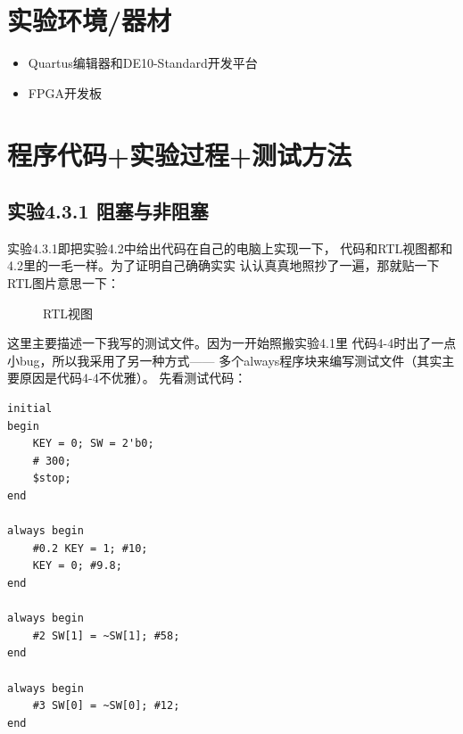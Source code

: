 \documentclass[12pt,a4paper,UTF8]{article}
\begin{document}
\section{实验环境/器材}
\begin{itemize}
  \item Quartus编辑器和DE10-Standard开发平台
  \item FPGA开发板
\end{itemize}

\section{程序代码+实验过程+测试方法}
\subsection{实验4.3.1 阻塞与非阻塞}
实验4.3.1即把实验4.2中给出代码在自己的电脑上实现一下，
代码和RTL视图都和4.2里的一毛一样。为了证明自己确确实实
认认真真地照抄了一遍，那就贴一下RTL图片意思一下：
\begin{figure}[H]
  \centering
  \caption{RTL视图}
  \label{RTL}
\end{figure}

这里主要描述一下我写的测试文件。因为一开始照搬实验4.1里
代码4-4时出了一点小bug，所以我采用了另一种方式------
多个always程序块来编写测试文件（其实主要原因是代码4-4不优雅）。
先看测试代码：
\begin{lstlisting}[style=verilog-style]
initial
begin
	KEY = 0; SW = 2'b0;
	# 300;
	$stop;
end

always begin
	#0.2 KEY = 1; #10; 
	KEY = 0; #9.8;
end                                                    

always begin
	#2 SW[1] = ~SW[1]; #58;
end

always begin
	#3 SW[0] = ~SW[0]; #12;
end 
\end{lstlisting}
\end{document}
